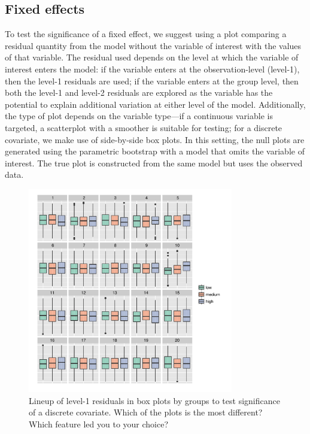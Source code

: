 \documentclass[12pt]{article}
\newcommand{\alnote}[1]{\todo[inline,color=green!40]{#1}} %
\begin{document}
\subsection{Fixed effects} 
To test the significance of a fixed effect, we suggest using a plot comparing a residual quantity from the model without the variable of interest with the values of that variable. 
The residual used depends on the level at which the variable of interest enters the model: if the variable enters at the observation-level (level-1), then the level-1 residuals are used; if the variable enters at the group level, then both the level-1 and level-2 residuals are explored as the variable has the potential to explain additional variation at either level of the model.
Additionally, the type of plot depends on the variable type---if a continuous variable is targeted,  a scatterplot with a smoother is suitable for testing; for a discrete covariate, we make use of side-by-side box plots. 
In this setting, the null plots are generated using the parametric bootstrap  with a model that omits the variable of interest. The true plot is constructed from the same model but uses the observed data. 

\begin{figure}[h]
	\centering
	\includegraphics[width=0.8\textwidth]{autism2-ordered-10.pdf}
	\caption{\label{fig:boxplot-ordered} {Lineup of level-1 residuals in box plots  by groups to test significance of a discrete covariate.}
	Which of the plots is the most different? Which feature led you to your choice?} 
\end{figure}
\end{document}
